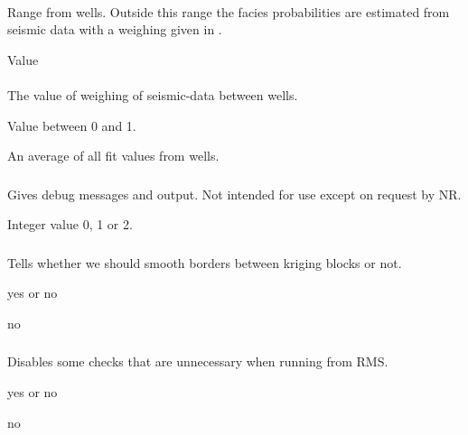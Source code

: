 \paragraph{}
 \slist
   \item \Description Range from wells. Outside this range the facies probabilities are estimated from seismic data with a weighing given in .
   \item \Argument Value
   \item {}
 \elist

\paragraph{}
 \slist
   \item \Description The value of weighing of seismic-data between wells.
   \item \Argument Value between 0 and 1.
   \item \Default An average of all fit values from wells.
 \elist

\subsubsection{}
 \slist
   \item \Description Gives debug messages and output. Not intended for use except on request by NR.
   \item \Argument Integer value 0, 1 or 2.
   \item {}
 \elist

\subsubsection{}
\slist
   \item \Description Tells whether we should smooth borders between kriging blocks or not.
   \item \Argument yes or no
   \item \Default no
\elist

\subsubsection{}
\slist
   \item \Description Disables some checks that are unnecessary when
   running from RMS.
   \item \Argument yes or no
   \item \Default no
\elist

